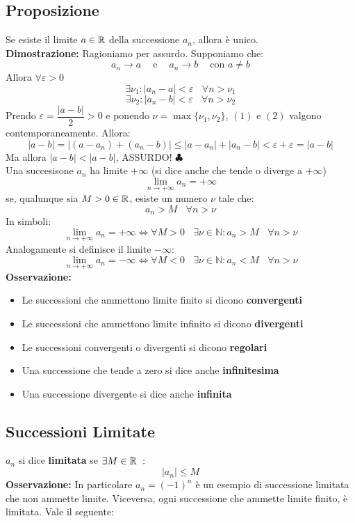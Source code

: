 \subsection{Proposizione}
Se esiste il limite $a\in\mathbb{R}$ della successione $a_n$, allora è unico.\\
\textbf{Dimostrazione:} Ragioniamo per assurdo. Supponiamo che:
\[
    a_n \to a \ \ \ \ \text{ e } \ \ \ \ a_n \to b \ \ \ \ \text{ con } a \neq b
\]
Allora $\forall\varepsilon > 0$
\[
    \exists \nu_1 : |a_n - a| < \varepsilon \ \ \ \ \forall n > \nu_1
\]
\[
    \exists \nu_2 : |a_n - b| < \varepsilon \ \ \ \ \forall n > \nu_2
\]
Prendo $\varepsilon = \dfrac{|a-b|}{2} > 0$ e ponendo $\nu = \max\{\nu_1,
    \nu_2\}$, $(1) \text{ e } (2)$ valgono contemporaneamente. Allora:
\[
    |a-b| = |(a-a_n) + (a_n-b)| \leq |a-a_n| + |a_n-b| < \varepsilon + \varepsilon = |a-b|
\]
Ma allora $|a-b| < |a-b|$, ASSURDO! $\clubsuit$ \\ Una succesisone $a_n$ ha
limite $+\infty$ (si dice anche che tende o diverge a $+\infty$)
\[
    \lim_{n\to+\infty}a_n = +\infty \]
se, qualunque sia $M > 0 \in \mathbb{R}$, esiste un numero $\nu$ tale che:
\[
    a_n > M \ \ \ \ \forall n > \nu
\]
In simboli:
\[
    \lim_{n\to+\infty}a_n = +\infty \iff \forall M > 0 \ \ \ \ \exists \nu \in \mathbb{N} : a_n > M \ \ \ \ \forall n > \nu
\]
Analogamente si definisce il limite $-\infty$:
\[
    \lim_{n\to+\infty}a_n = -\infty \iff \forall M < 0 \ \ \ \ \exists \nu \in \mathbb{N} : a_n < M \ \ \ \ \forall n > \nu
\]
\textbf{Osservazione:} \begin{itemize}
    \item Le successioni che ammettono limite finito si dicono \textbf{convergenti}
    \item Le successioni che ammettono limite infinito si dicono \textbf{divergenti}
    \item Le successioni convergenti o divergenti si dicono \textbf{regolari}
    \item Una successione che tende a zero si dice anche \textbf{infinitesima}
    \item Una successione divergente si dice anche \textbf{infinita}
\end{itemize}

\subsection{Successioni Limitate}
$a_n$ si dice \textbf{limitata} se $\exists M\in\mathbb{R} \ : $
\[
    |a_n| \leq M
\]
\textbf{Osservazione:} In particolare $a_n = (-1)^n$ è un esempio di successione limitata che non ammette limite. Viceversa, ogni successione che ammette limite finito, è limitata. Vale il seguente:
